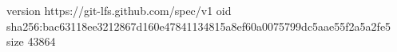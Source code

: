 version https://git-lfs.github.com/spec/v1
oid sha256:bac63118ee3212867d160e47841134815a8ef60a0075799dc5aae55f2a5a2fe5
size 43864
